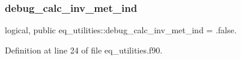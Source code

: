 \subsubsection{\texorpdfstring{debug\+\_\+calc\+\_\+inv\+\_\+met\+\_\+ind}{debug\_calc\_inv\_met\_ind}}
{\footnotesize\ttfamily logical, public eq\+\_\+utilities\+::debug\+\_\+calc\+\_\+inv\+\_\+met\+\_\+ind = .false.}



Definition at line 24 of file eq\+\_\+utilities.\+f90.

